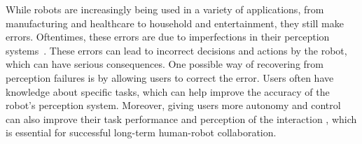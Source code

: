 \documentclass[letterpaper, 10 pt, conference]{ieeeconf}  %
\begin{document}



While robots are increasingly being used in a variety of applications, from manufacturing and healthcare to household and entertainment, they still make errors. Oftentimes, these errors are due to imperfections in their perception systems~\cite{schutte2017robot}. These errors can lead to incorrect decisions and actions by the robot, which can have serious consequences. One possible way of recovering from perception failures is by allowing users to correct the error. Users often have knowledge about specific tasks, which can help improve the accuracy of the robot's perception system. Moreover, giving users more autonomy and control can also improve their task performance and perception of the interaction \cite{wallkotter2021}, which is essential for successful long-term human-robot collaboration.

\end{document}
